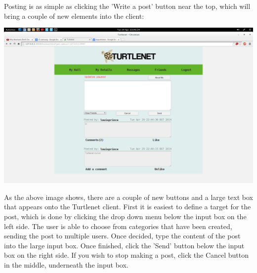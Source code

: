 Posting is as simple as clicking the 'Write a post' button near the top, which
will bring a couple of new elements into the client:

\includegraphics[scale=0.2]{screenshots/Screenshot from 2014-04-29 22-46-29}

As the above image shows, there are a couple of new buttons and a large text box
that appears onto the Turtlenet client. First it is easiest to define a target
for the post, which is done by clicking the drop down menu below the input box
on the left side. The user is able to choose from categories
that have been created, sending the post to multiple users. Once decided, type
the content of the post into the large input box. Once finished, click the
'Send' button below the input box on the right side. If you wish to stop
making a post, click the Cancel button in the middle, underneath the input box.
